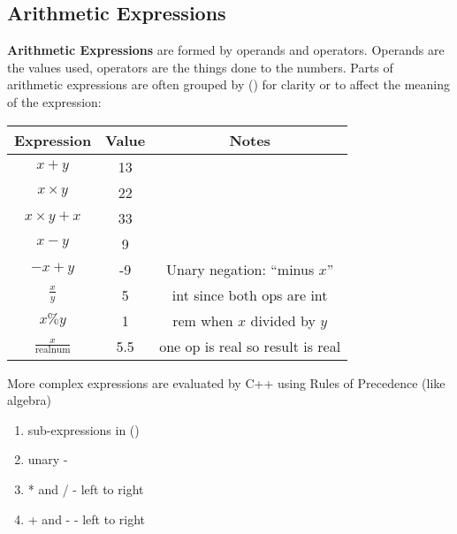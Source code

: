 \documentclass{report}
\begin{document}
        \subsection{Arithmetic Expressions}
        \textbf{Arithmetic Expressions} are formed by operands and operators. Operands are the values used, operators are the things done to the numbers. Parts of arithmetic expressions are often grouped by () for clarity or to affect the meaning of the expression:
        \bigbreak \noindent 
        \begin{center}
         \begin{tabular}{|c|c|c|}
                \hline
                Expression & Value & Notes \\
                \hline
                \( x + y \) & 13 & \\
                \( x \times y \) & 22 & \\
                \( x \times y + x \) & 33 & \\
                \( x - y \) & 9 & \\
                \( -x + y \) & -9 & Unary negation: ``minus \( x \)'' \\
                \( \frac{x}{y} \) & 5 & int since both ops are int \\
                \( x \% y \) & 1 & rem when \( x \) divided by \( y \) \\
                \( \frac{x}{\text{realnum}} \) & 5.5 & one op is real so result is real  \\
                \hline
            \end{tabular}
        \end{center}
        \bigbreak \noindent 
        \bigbreak \noindent 
        More complex expressions are evaluated by C++ using Rules of Precedence (like algebra)
        \begin{enumerate}
            \item sub-expressions in ()
            \item unary -
            \item * and / - left to right
            \item + and - - left to right
        \end{enumerate}
\end{document}
